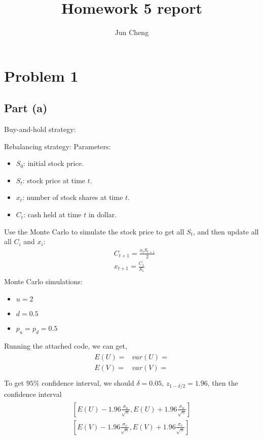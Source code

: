 \documentclass{report}
\begin{document}
\title{Homework 5 report}
\author{Jun Cheng}
\maketitle

\section*{Problem 1} 
\subsection*{Part (a)} 
Buy-and-hold strategy: 

Rebalancing strategy: 
Parameters: 
\begin{itemize}
\item $S_0$: initial stock price.
\item $S_t$: stock price at time $t$.
\item $x_t$: number of stock shares at time $t$.
\item $C_t$: cash held at time $t$ in dollar. 
\end{itemize}
Use the Monte Carlo to simulate the stock price to get all $S_t$,  and then update all all $C_i $ and $x_i$: 
\begin{align*}
&C_{t+1}=\frac{x_tS_{t+1}}{2} \\
&x_{t+1}=\frac{C_1}{S_1}\\
\end{align*}
Monte Carlo simulations: 
\begin{itemize}
\item $ u=2$
\item $ d=0.5$
\item $p_u = p_d = 0.5$
\end{itemize} 
Running the attached code, we can get, 
\begin{align*}\begin{array}{ll}
E(U)=  & var(U) =\\
E(V)=   & var(V)=\\
\end{array} \end{align*}
To get $95\% $ confidence interval, we should $\delta = 0.05$, $z_{1-\delta/2}=1.96$, then the confidence interval
\begin{align*}
\begin{array}{ll}
\left[E(U)-1.96\frac{\sigma_u}{\sqrt{n}}, E(U)+1.96\frac{\sigma_u}{\sqrt{n}}\right]   \\ %
\left[E(V)-1.96\frac{\sigma_v}{\sqrt{n}},  E(V)+1.96\frac{\sigma_v}{\sqrt{n}}\right] \\ %
\end{array}
\end{align*}
\end{document}
